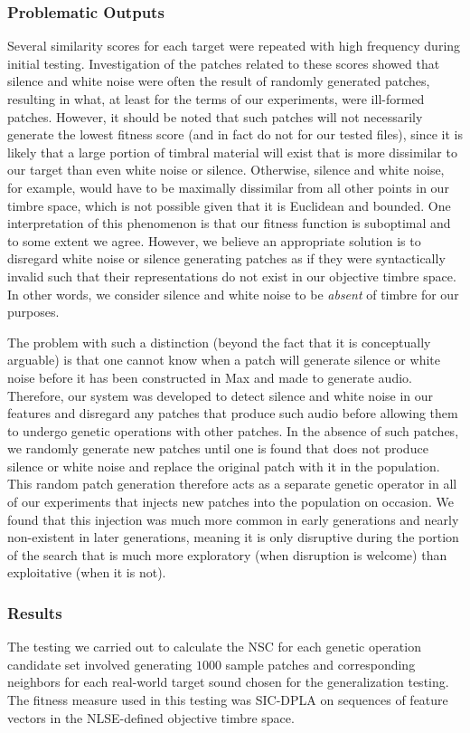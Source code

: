 \documentclass[a4paper,12pt]{report} 	%
\numberwithin{figure}{chapter}
\numberwithin{table}{chapter}
\numberwithin{equation}{chapter}
\begin{document}
\begin{flushleft}
\subsubsection{Problematic Outputs}
Several similarity scores for each target were repeated with high frequency during initial testing. Investigation of the patches related to these scores showed that silence and white noise were often the result of randomly generated patches, resulting in what, at least for the terms of our experiments, were ill-formed patches. However, it should be noted that such patches will not necessarily generate the lowest fitness score (and in fact do not for our tested files), since it is likely that a large portion of timbral material will exist that is more dissimilar to our target than even white noise or silence. Otherwise, silence and white noise, for example, would have to be maximally dissimilar from all other points in our timbre space, which is not possible given that it is Euclidean and bounded. One interpretation of this phenomenon is that our fitness function is suboptimal and to some extent we agree. However, we believe an appropriate solution is to disregard white noise or silence generating patches as if they were syntactically invalid such that their representations do not exist in our objective timbre space. In other words, we consider silence and white noise to be \emph{absent} of timbre for our purposes.

The problem with such a distinction (beyond the fact that it is conceptually arguable) is that one cannot know when a patch will generate silence or white noise before it has been constructed in Max and made to generate audio. Therefore, our system was developed to detect silence and white noise in our features and disregard any patches that produce such audio before allowing them to undergo genetic operations with other patches. In the absence of such patches, we randomly generate new patches until one is found that does not produce silence or white noise and replace the original patch with it in the population. This random patch generation therefore acts as a separate genetic operator in all of our experiments that injects new patches into the population on occasion. We found that this injection was much more common in early generations and nearly non-existent in later generations, meaning it is only disruptive during the portion of the search that is much more exploratory (when disruption is welcome) than exploitative (when it is not).
\subsubsection{Results}
The testing we carried out to calculate the NSC for each genetic operation candidate set involved generating $1000$ sample patches and corresponding neighbors for each real-world target sound chosen for the generalization testing. The fitness measure used in this testing was SIC-DPLA on sequences of feature vectors in the NLSE-defined objective timbre space.


\end{flushleft}
\end{document}
